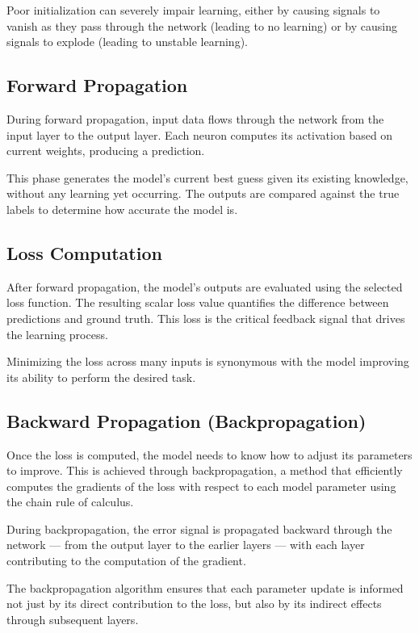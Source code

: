 \documentclass[openany]{book}
\begin{document}
Poor initialization can severely impair learning, either by causing signals to 
vanish as they pass through the network (leading to no learning) or by causing 
signals to explode (leading to unstable learning).

\subsection{Forward Propagation}

During forward propagation, input data flows through the network from the input 
layer to the output layer. Each neuron computes its activation based on current 
weights, producing a prediction.

This phase generates the model's current best guess given its existing 
knowledge, without any learning yet occurring. The outputs are compared against 
the true labels to determine how accurate the model is.

\subsection{Loss Computation}

After forward propagation, the model's outputs are evaluated using the selected 
loss function. The resulting scalar loss value quantifies the difference between 
predictions and ground truth. This loss is the critical feedback signal that 
drives the learning process.

Minimizing the loss across many inputs is synonymous with the model improving 
its ability to perform the desired task.

\subsection{Backward Propagation (Backpropagation)}

Once the loss is computed, the model needs to know how to adjust its parameters 
to improve. This is achieved through backpropagation, a method that efficiently 
computes the gradients of the loss with respect to each model parameter using 
the chain rule of calculus.

During backpropagation, the error signal is propagated backward through the 
network — from the output layer to the earlier layers — with each layer 
contributing to the computation of the gradient.

The backpropagation algorithm ensures that each parameter update is informed not 
just by its direct contribution to the loss, but also by its indirect effects 
through subsequent layers.
\end{document}

